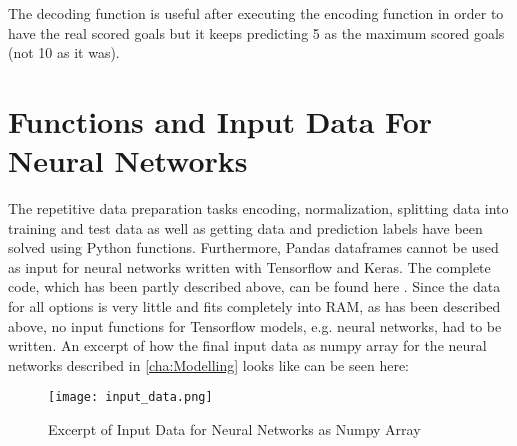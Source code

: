 The decoding function is useful after executing the encoding function in order to have the real scored goals but it keeps predicting 5 as the maximum scored goals (not 10 as it was).



\section {Functions and Input Data For Neural Networks}
The repetitive data preparation tasks encoding, normalization, splitting data into training and test data as well as getting data and prediction labels have been solved using Python functions. Furthermore, Pandas dataframes cannot be used as input for neural networks written with Tensorflow and Keras. The complete code, which has been partly described above, can be found here \cite{colab_nn}.
\newline
Since the data for all options is very little and fits completely into RAM, as has been described above, no input functions for Tensorflow models, e.g. neural networks, had to be written. An excerpt of how the final input data as numpy array for the neural networks described in \autoref{cha:Modelling} looks like can be seen here:

\begin{figure}[H]
\begin{center}
\texttt{[image: input\_data.png]}
\end{center}
\caption{Excerpt of Input Data for Neural Networks as Numpy Array}
\label{fig:inpud_data}
\end{figure}















